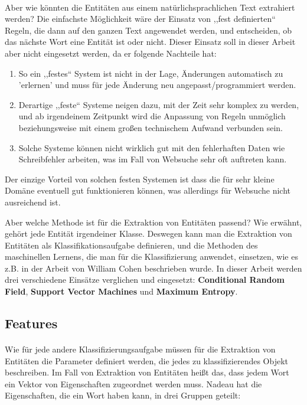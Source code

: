 \paragraph{}
Aber wie könnten die Entitäten aus einem natürlichsprachlichen Text extrahiert werden? Die einfachste Möglichkeit wäre der Einsatz von ,,fest definierten`` Regeln, die dann auf den ganzen Text angewendet werden, und entscheiden, ob das nächste Wort eine Entität ist oder nicht. Dieser Einsatz soll in dieser Arbeit aber nicht eingesetzt werden, da er folgende Nachteile\cite{baluja2000applying} hat:
\begin{enumerate}
\item So ein ,,festes`` System ist nicht in der Lage, Änderungen automatisch zu 'erlernen' und muss für jede Änderung neu angepasst/programmiert werden.
\item Derartige ,,feste`` Systeme neigen dazu, mit der Zeit sehr komplex zu werden, und ab irgendeinem Zeitpunkt wird die Anpassung von Regeln unmöglich beziehungsweise mit einem großen technischem Aufwand verbunden sein.
\item Solche Systeme können nicht wirklich gut mit den fehlerhaften Daten wie Schreibfehler arbeiten, was im Fall von Websuche sehr oft auftreten kann.
\end{enumerate}  
Der einzige Vorteil von solchen festen Systemen ist dass die für sehr kleine Domäne eventuell gut funktionieren können, was allerdings für Websuche nicht ausreichend ist.

Aber welche Methode ist für die Extraktion von Entitäten passend? Wie erwähnt, gehört jede Entität irgendeiner Klasse. Deswegen kann man die Extraktion von Entitäten als Klassifikationsaufgabe definieren, und die Methoden des maschinellen Lernens, die man für die Klassifizierung anwendet, einsetzen, wie es z.B. in der Arbeit von William Cohen\cite{cohen2004exploiting} beschrieben wurde. In dieser Arbeit werden drei verschiedene Einsätze verglichen und eingesetzt: \textbf{Conditional Random Field}, \textbf{Support Vector Machines} und \textbf{Maximum Entropy}.

\subsection{Features}
\paragraph{}
Wie für jede andere Klassifizierungsaufgabe müssen für die Extraktion von Entitäten die Parameter definiert werden, die jedes zu klassifizierendes Objekt beschreiben. Im Fall von Extraktion von Entitäten  heißt das, dass jedem Wort ein Vektor von Eigenschaften zugeordnet werden muss. Nadeau\cite{nadeau2007survey} hat die Eigenschaften, die ein Wort haben kann, in drei Gruppen geteilt:

